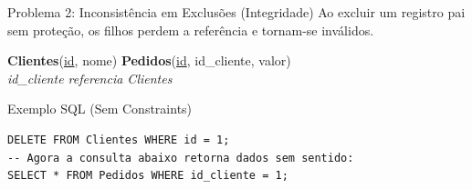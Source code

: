\documentclass[9pt]{beamer}
\begin{document}
\begin{frame}[fragile]{Problema 2: Inconsistência em Exclusões (Integridade)}
  \small
  Ao excluir um registro pai sem proteção, os filhos perdem a referência e tornam-se inválidos.
  \vspace{0.2cm}
  \centering
  \centering\scriptsize
  \textbf{Clientes}(\underline{id}, nome) \quad \textbf{Pedidos}(\underline{id}, \color{red}id\_cliente\color{black}, valor) \\
  \textit{id\_cliente referencia Clientes}
  \vspace{0.1cm}
  \begin{exampleblock}{Exemplo SQL (Sem Constraints)}
\begin{lstlisting}
DELETE FROM Clientes WHERE id = 1;
-- Agora a consulta abaixo retorna dados sem sentido:
SELECT * FROM Pedidos WHERE id_cliente = 1;
\end{lstlisting}
  \end{exampleblock}
\end{frame}
\end{document}
